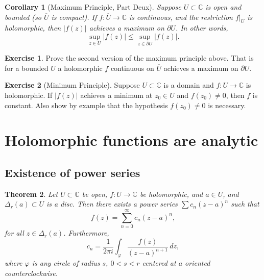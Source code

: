\documentclass[12pt,openany]{book}
\newcommand{\sabs}[1]{\lvert {#1} \rvert}
\newcommand{\C}{{\mathbb{C}}}
\theoremstyle{plain}
\newtheorem{thm}{Theorem}[section]
\newtheorem{cor}[thm]{Corollary}
\theoremstyle{remark}
\theoremstyle{definition}
\newenvironment{exbox}{%
    \def\FrameCommand{\vrule width 1pt \relax\hspace {10pt}}%
    \MakeFramed {\advance \hsize -\width \FrameRestore }%
}{%
    \endMakeFramed
}
\theoremstyle{exercise}
\newtheorem{exercise}{Exercise}[section]
\theoremstyle{example}
\begin{document}
\begin{cor}[Maximum Principle, Part Deux]
Suppose $U \subset \C$ is open and bounded (so $\overline{U}$ is compact).
If $f \colon \overline{U} \to \C$ is continuous, and the restriction $f|_{U}$
is holomorphic, then $\sabs{f(z)}$ achieves a maximum on $\partial U$.  In
other words,
\begin{equation*}
\sup_{z \in U} \sabs{f(z)} \leq
\sup_{z \in \partial U} \sabs{f(z)} .
\end{equation*}
\end{cor}

\begin{exbox}
\begin{exercise}
Prove the second version of the maximum principle above.
That is for a bounded $U$ a holomorphic $f$ continuous
on $\overline{U}$ achieves a maximum on $\partial U$.
\end{exercise}

\begin{exercise}[Minimum Principle]
Suppose $U \subset \C$ is a domain and
$f \colon U \to \C$ is holomorphic.
If $\sabs{f(z)}$ achieves a minimum at $z_0 \in U$ and $f(z_0) \not= 0$,
then $f$ is constant.  Also show by example that the hypothesis $f(z_0)
\not= 0$ is necessary.
\end{exercise}
\end{exbox}


\section{Holomorphic functions are analytic}
\label{sec:holoanal}

\subsection{Existence of power series}

\begin{thm}
Let $U \subset \C$ be open, $f \colon U \to \C$ be
holomorphic, and $a \in U$, and $\Delta_r(a) \subset U$
is a disc.
Then there exists a power series $\sum c_n {(z-a)}^n$
such that
\begin{equation*}
f(z) = \sum_{n=0}^\infty c_n {(z-a)}^n ,
\end{equation*}
for all $z \in \Delta_r(a)$.
Furthermore,
\begin{equation*}
c_n = 
\frac{1}{2\pi i}
\int_{\varphi}
\frac{f(z)}{{(z-a)}^{n+1}}
\,
dz  ,
\end{equation*}
where $\varphi$ is any circle of radius $s$, $0 < s < r$ centered at
$a$ oriented counterclockwise.
\end{thm}
\end{document}
